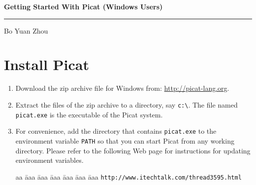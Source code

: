 \documentclass{article}[12pt]
\newcommand{\ignore}[1]{}
\begin{document}
\begin{center}
\textbf{\huge{Getting Started With Picat (Windows Users)}}\\
\end{center}
\rule{450pt}{1pt}

\vspace*{5mm}
\begin{center}
{\Large Bo Yuan Zhou}
\end{center}

\vspace*{5mm}

\section*{\Large{Install Picat}}
\begin{enumerate}
\item Download the zip archive file for Windows from: \url{http://picat-lang.org}.
\item Extract the files of the zip archive to a directory, say \verb+c:\+. The file named \verb+picat.exe+ is the executable of the Picat system.
\item For convenience, add the directory that contains \verb+picat.exe+ to the environment variable \texttt{PATH} so that you can start Picat from any working directory. Please refer to the following Web page for instructions for updating environment variables.
\begin{tabbing}
aa \= aaa \= aaa \= aaa \= aaa \= aaa \= aaa \kill
\> \> \verb+http://www.itechtalk.com/thread3595.html+ 
\end{tabbing}
\end{enumerate}

\ignore{
Once you're finished, the directory that you are in should look like this:
\\
\\
\texttt{[image: tutorial\_2.jpg]}
\\
}
\end{document}
